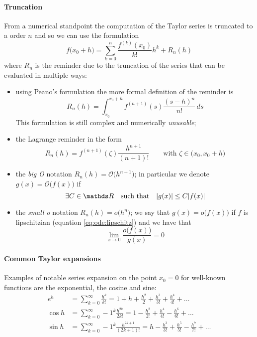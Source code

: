 	\paragraph{Truncation} From a numerical standpoint the computation of the Taylor series is truncated to a order $n$ and so we can use the formulation
	\begin{equation}
		f\big(x_0 + h\big) = \sum_{k=0}^{n} \frac{f^{(k)}(x_0)}{k!} h^k + R_n(h)
	\end{equation}
	where $R_n$ is the reminder due to the truncation of the series that can be evaluated in multiple ways:
	\begin{itemize}
		\item using Peano's formulation the more formal definition of the reminder is
		\[ R_n(h) = \int_{x_0}^{x_0+h} f^{(n+1)} (s) \frac{(s-h)^n}{n!}\, ds\]
		This formulation is still complex and numerically \textit{unusable};
		\item the Lagrange reminder in the form
		\[ R_n(h) = f^{(n+1)}(\zeta) \frac{h^{n+1}}{(n+1)!} \qquad \textrm{with } \zeta \in \big( x_0,x_0+h \big) \]
		\item the \textit{big O} notation $R_n(h) = \mathcal O\big(h^{n+1}\big)$; in particular we denote $g(x) = \mathcal O\big(f(x)\big)$ if 
		\[ \exists C \in \R \quad \textrm{such that} \quad |g(x)| \leq C|f(x)| \]
		\item the \textit{small o} notation $R_n(h) = o\big(h^n\big)$; we say that $g(x) = o\big(f(x)\big)$ if $f$ is lipschitzian (equation \ref{eq:ode:lipschitz}) and we have that
		\[ \lim_{x\rightarrow 0} \frac{o\big(f(x)\big)}{g(x)} = 0 \]
	\end{itemize}
	
	\paragraph{Common Taylor expansions}Examples of notable series expansion on the point $x_0 = 0$ for well-known functions are the exponential, the cosine and sine:
	\begin{equation}
	\begin{split}
		e^h & = \sum_{k=0}^\infty \frac{h^k}{k!} = 1 + h + \frac{h^2}{2} + \frac{h^3}{3!} + \frac{h^4}{4!} + \dots \\
		\cos h & = \sum_{k=0}^{\infty} -1^{k} \frac{h^{2k}}{2k!} = 1 - \frac{h^2}{2!} + \frac{h^4}{4!} - \frac{h^6}{6!} + \dots \\
		\sin h & = \sum_{k=0}^{\infty} -1^{k} \frac{h^{2k+1}}{(2k+1)!} = h - \frac{h^3}{3!} + \frac{h^5}{5!} - \frac{h^7}{7!} + \dots
	\end{split}
	\end{equation}
	
	
	
	
	
	
	
	
	
	
	
	
	
	
	
	
	
	
	
	